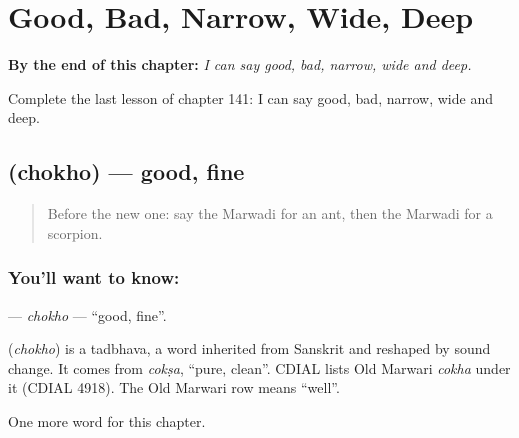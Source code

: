 
\chapter{Good, Bad, Narrow, Wide, Deep}
\label{ch:mw-good-bad-narrow-wide-deep}

\begin{chapteropening}
\textbf{By the end of this chapter:} \emph{I can say good, bad, narrow, wide and deep.}

Complete the last lesson of chapter 141: I can say good, bad, narrow, wide and deep.
\end{chapteropening}

\section[\texorpdfstring{\mw{चोखो} (chokho)}{चोखो (chokho)}]{ (chokho) — good, fine}

\label{lesson:MW-C141-chokho}



\begin{quote}
Before the new one: say the Marwadi for an ant, then the Marwadi for a scorpion.
\end{quote}

\subsection*{You'll want to know: }
\textbf{} — \emph{chokho} — \textquotedblleft{}good, fine\textquotedblright{}.

\begin{cousinweb}
\textbf{} (\emph{chokho}) is a tadbhava, a word inherited from Sanskrit and reshaped by sound change. It comes from \emph{cokṣa}, \textquotedblleft{}pure, clean\textquotedblright{}. CDIAL lists Old Marwari \emph{cokha} under it (CDIAL 4918). The Old Marwari row means \textquotedblleft{}well\textquotedblright{}.
\end{cousinweb}

\begin{grammarlens}[title={What you've built}]
One more word for this chapter.
\end{grammarlens}

